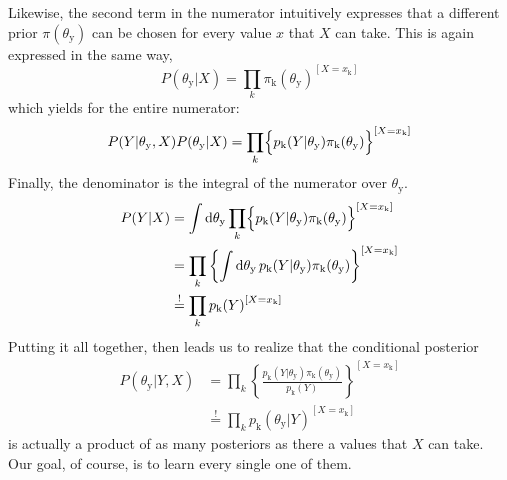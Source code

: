 \documentclass[]{report}
\begin{document}
Likewise, the second term in the numerator intuitively expresses that a different prior $\pi( \theta_\mathrm{y} ) $ can be chosen for every value $x$ that $X$ can take. This is again expressed in the same way,
\begin{equation} \label{eq:2param_prior_Y}
P( \theta_\mathrm{y} | X ) 
=
\prod_{k}
	{
		\pi_\mathrm{k}( \theta_\mathrm{y} )
	}^{
		[ X = x_\mathrm{k} ]
	}
\end{equation}
which yields for the entire numerator:
\begin{equation}
P( Y | \theta_\mathrm{y}, X )
P( \theta_\mathrm{y} | X ) 
=
\prod_{k}
	\Bigl\{
		p_\mathrm{k}( Y | \theta_\mathrm{y} )
		\pi_\mathrm{k}( \theta_\mathrm{y} )
	\Bigr\}^{
		[ X = x_\mathrm{k} ]
	}
\end{equation}
Finally, the denominator is the integral of the numerator over $\theta_\mathrm{y}$.
\begin{align}
P(Y|X)
&=
\int \mathrm{d}\theta_\mathrm{y}
	\prod_{k}
		\Bigl\{
			p_\mathrm{k}( Y | \theta_\mathrm{y} )
			\pi_\mathrm{k}( \theta_\mathrm{y} )
		\Bigr\}^{
			[ X = x_\mathrm{k} ]
		}
\nonumber \\ 
&=
\prod_{k}
	\left\{
		\int \mathrm{d}\theta_\mathrm{y} \,
			p_\mathrm{k}( Y | \theta_\mathrm{y} )
			\pi_\mathrm{k}( \theta_\mathrm{y} )
	\right\}^{
		[ X = x_\mathrm{k} ]
	}
\\
&\stackrel{!}{=}
\prod_{k}
	{
		p_\mathrm{k}( Y )
	}^{
		[ X = x_\mathrm{k} ]
	}
\nonumber
\end{align}
Putting it all together, then leads us to realize that the conditional posterior
\begin{align}
P( \theta_\mathrm{y} |Y, X ) 
&=
\prod_{k}
	\left\{
		\frac
			{
				p_\mathrm{k}( Y | \theta_\mathrm{y} )
				\pi_\mathrm{k}( \theta_\mathrm{y} )
			}
			{
				p_\mathrm{k}( Y )
			}
	\right\}^{
		[ X = x_\mathrm{k} ]
	}
\nonumber \\
&\stackrel{!}{=}
\prod_{k}
	{
		p_\mathrm{k}( \theta_\mathrm{y} | Y )
	}^{
		[ X = x_\mathrm{k} ]
	}
\end{align}
is actually a product of as many posteriors as there a values that $X$ can take. Our goal, of course, is to learn every single one of them.
\end{document}

